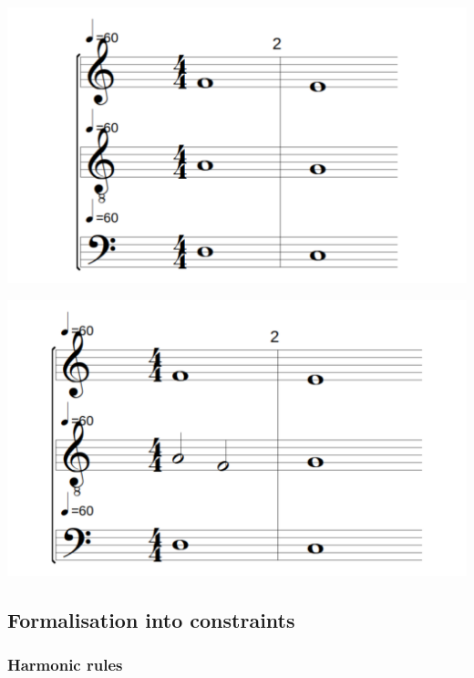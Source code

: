 \begin{enumerate}[wide, label=\bfseries 2.P\arabic*]
\vspace{.5cm}
\begin{minipage}{0.46\textwidth}
    \centering
    \includegraphics[width=\textwidth]{Images/successive-fifths.png}
    \label{fig:successive-fifths-1}
    \end{minipage}
    \hfill
    \begin{minipage}{0.46\textwidth}
      \centering
      \includegraphics[width=\textwidth]{Images/successive-fifths-flanking-a-third.png}
      \label{fig:successive-fifths-2}
\end{minipage}
\end{enumerate}

\subsection{Formalisation into constraints}
\subsubsection{Harmonic rules}

